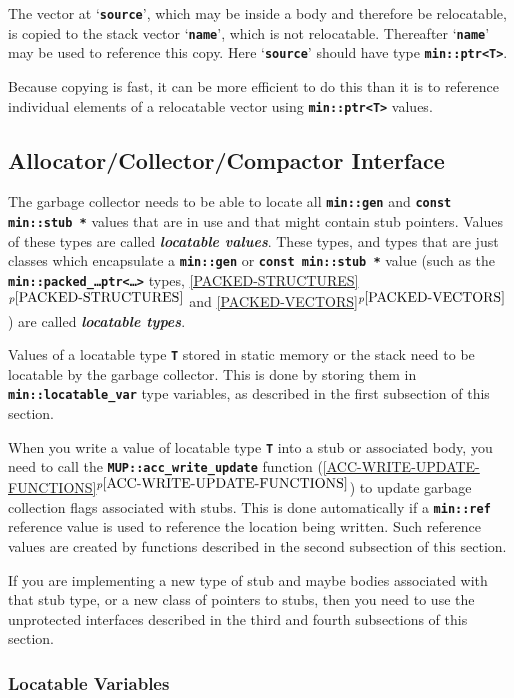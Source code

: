 \documentclass[12pt]{article}
\newcommand{\TT}[1]{{\tt \bfseries #1}}
\newcommand{\skey}[2]{{\bf \em #1#2}\index{#1}}
\newcommand{\itemref}[1]{\ref{#1}$^{p\pageref{#1}}$}
\newcommand{\EOL}{\penalty \exhyphenpenalty}
\newcommand{\BRACKETED}[1]{{\tt <#1>}}
\begin{document}
The vector at `\TT{source}', which may be inside a body and therefore
be relocatable, is copied to the stack vector `\TT{name}', which
is not relocatable.
Thereafter `\TT{name}' may be used to reference this copy.
Here `\TT{source}' should have type \TT{min::ptr<T>}.

Because copying is fast, it can be more efficient to do this than
it is to reference individual elements of a relocatable vector using
\TT{min::ptr<T>} values.

\subsection{Allocator/Collector/Compactor Interface}
\label{ACC-INTERFACE}

The garbage collector needs to be able to locate all
\TT{min::gen} and \TT{const min::\EOL stub~*} values
that are in use and that might contain stub pointers.
Values of these types are called \skey{locatable value}s.%
\label{LOCATABLE-VALUE}
These types, and types that are just classes which
encapsulate a \TT{min::\EOL gen} or \TT{const min::\EOL stub~*}
value (such as the \TT{min::packed\_\ldots ptr\BRACKETED{\ldots}} types,
\itemref{PACKED-STRUCTURES} and
\itemref{PACKED-VECTORS})
are called \skey{locatable type}s.%
\label{LOCATABLE-TYPE}

Values of a locatable type \TT{T} stored in static memory or the stack
need to be locatable by the garbage collector.  This is done
by storing them in \TT{min::\EOL locatable\_\EOL var\TARG} type
variables, as described in the first subsection of this section.

When you write a value of locatable type \TT{T} into a stub or associated
body, you need to call the \TT{MUP::\EOL acc\_\EOL write\_\EOL update}
function (\itemref{ACC-WRITE-UPDATE-FUNCTIONS}) to update garbage
collection flags associated with stubs.
This is done automatically if a \TT{min::\EOL ref\TARG} reference value is
used to reference the location being written.  Such reference values are created
by functions described in the second subsection of this section.

If you are implementing a new type of stub and maybe bodies
associated with that stub type, or a new class of pointers to stubs,
then you need to use the unprotected
interfaces described in the third and fourth subsections of this section.

\subsubsection{Locatable Variables}
\label{LOCATABLE-VARIABLES}
\end{document}
